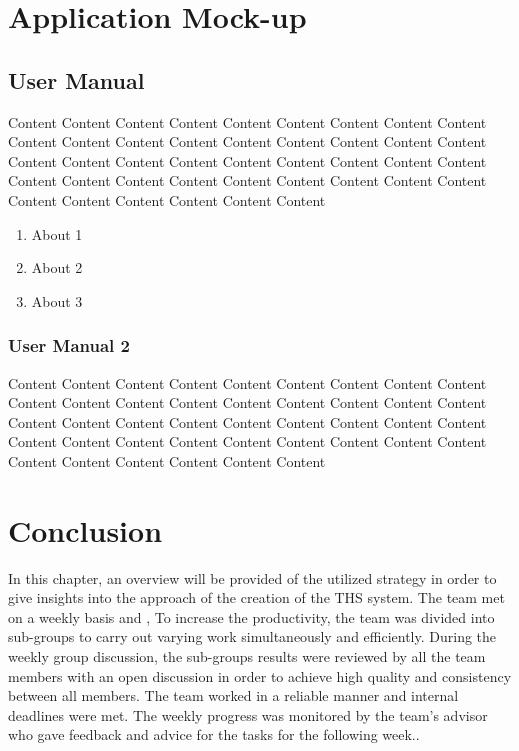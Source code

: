 \documentclass[fontsize=11pt]{extarticle}
\numberwithin{figure}{section} %
\numberwithin{table}{section}%
\providecommand{\tightlist}{%
  \setlength{\itemsep}{0pt}\setlength{\parskip}{0pt}}
\begin{document}
\hypertarget{application-mock-up}{%
\section{Application Mock-up}\label{application-mock-up}}

\hypertarget{user-manual}{%
\subsection{User Manual}\label{user-manual}}

Content Content Content Content Content Content Content Content Content
Content Content Content Content Content Content Content Content Content
Content Content Content Content Content Content Content Content Content
Content Content Content Content Content Content Content Content Content
Content Content Content Content Content Content

\begin{enumerate}

\tightlist
\item
  About 1
\item
  About 2
\item
  About 3
\end{enumerate}

\hypertarget{user-manual-2}{%
\subsubsection{User Manual 2}\label{user-manual-2}}

Content Content Content Content Content Content Content Content Content
Content Content Content Content Content Content Content Content Content
Content Content Content Content Content Content Content Content Content
Content Content Content Content Content Content Content Content Content
Content Content Content Content Content Content

\newpage

\hypertarget{conclusion}{%
\section{Conclusion}\label{conclusion}}

In this chapter, an overview will be provided of the utilized strategy
in order to give insights into the approach of the creation of the THS
system. The team met on a weekly basis and , To increase the
productivity, the team was divided into sub-groups to carry out varying
work simultaneously and efficiently. During the weekly group discussion,
the sub-groups results were reviewed by all the team members with an
open discussion in order to achieve high quality and consistency between
all members. The team worked in a reliable manner and internal deadlines
were met. The weekly progress was monitored by the team's advisor who
gave feedback and advice for the tasks for the following week..
\end{document}
